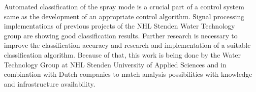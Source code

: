 Automated classification of the spray mode is a crucial part of a control system same as the development of an appropriate control algorithm. 
Signal processing implementations of previous projects of the NHL Stenden Water Technology group are showing good classification results.
Further research is necessary to improve the classification accuracy and research and implementation of a suitable classification algorithm. 
Because of that, this work is being done by the Water Technology Group at NHL Stenden University of Applied Sciences and in combination with Dutch companies to match analysis possibilities with knowledge and infrastructure availability.








    

    
